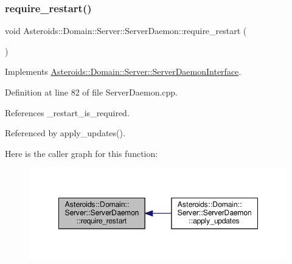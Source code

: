\mbox{\label{classAsteroids_1_1Domain_1_1Server_1_1ServerDaemon_a11925ed5e5c6951aceac9c823789476e}} 
\subsubsection{\texorpdfstring{require\+\_\+restart()}{require\_restart()}}
{\footnotesize\ttfamily void Asteroids\+::\+Domain\+::\+Server\+::\+Server\+Daemon\+::require\+\_\+restart (\begin{DoxyParamCaption}{ }\end{DoxyParamCaption})\hspace{0.3cm}{\ttfamily [virtual]}}



Implements \hyperlink{classAsteroids_1_1Domain_1_1Server_1_1ServerDaemonInterface_ade086bdbaf264f921653ce56ca31b442}{Asteroids\+::\+Domain\+::\+Server\+::\+Server\+Daemon\+Interface}.



Definition at line 82 of file Server\+Daemon.\+cpp.



References \+\_\+restart\+\_\+is\+\_\+required.



Referenced by apply\+\_\+updates().

Here is the caller graph for this function\+:\nopagebreak
\begin{figure}[H]
\begin{center}
\leavevmode
\includegraphics[width=348pt]{classAsteroids_1_1Domain_1_1Server_1_1ServerDaemon_a11925ed5e5c6951aceac9c823789476e_icgraph}
\end{center}
\end{figure}
\mbox{\label{classAsteroids_1_1Domain_1_1Server_1_1ServerDaemon_a3f49917f69b862fd6dc916ad15fa2f92}} 
